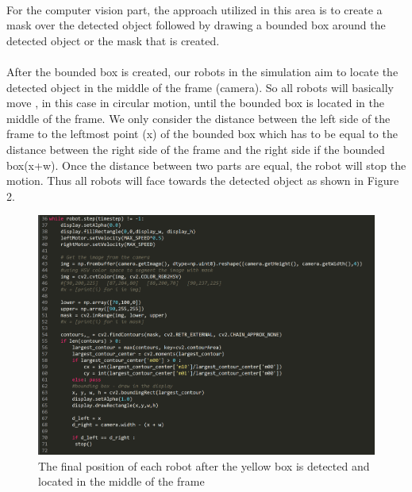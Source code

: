 \paragraph*{}
For the computer vision part, the approach utilized in this area is to create a mask over the detected object followed by drawing a bounded box around the detected object or the mask that is created.

\paragraph*{}
After the bounded box is created, our robots in the simulation aim to locate the detected object in the middle of the frame (camera). So all robots will basically move , in this case in circular motion, until the bounded box is located in the middle of the frame. We only consider the distance between the left side of the frame to the leftmost point (x) of the bounded box which has to be equal to the distance between the right side of the frame and the right side if the bounded box(x+w). Once the distance between two parts are equal, the robot will stop the motion. Thus all robots will face towards the detected object as shown in Figure 2.

\begin{figure}[H]
    \centering
    \includegraphics[width=0.6\linewidth]{assets/images/object_detection/figure1.png}
    \caption{The final position of each robot after the yellow box is detected and located in the middle of the frame}
    \label{fig:object detection figure 2.} 
\end{figure}